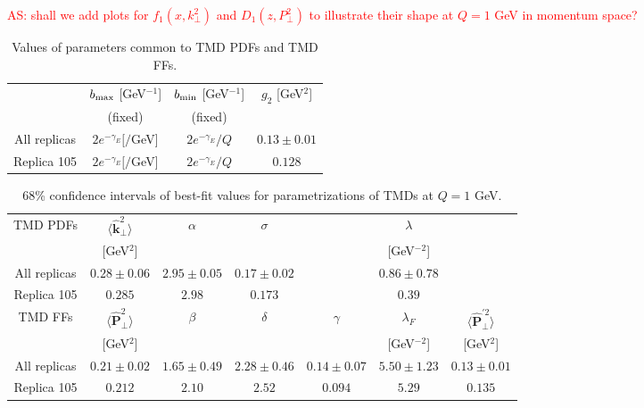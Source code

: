 \documentclass[aps,preprintnumbers,showpacs,nofootinbib,superscriptaddress,floatfix]{revtex4}
\newcommand{\T}{\perp}
\begin{document}
\textcolor{red}{AS: shall we add plots for $f_1(x,k_\perp^2)$ and $D_1(z,P_\perp^2)$ to illustrate their shape at $Q=1$ GeV in momentum space?}
\begin{table}[h!]
\small
  \centering
  \begin{tabular}{|c|c|c|c|}
\hline
\hline
&$b_{\rm max}$ [GeV$^{-1}$] & $b_{\rm min}$ [GeV$^{-1}$] &  $g_2$ {[GeV$^2$]} 
 \\ 
& (fixed)     & (fixed)   &                            \\
\hline
All replicas & $2 e^{-\gamma_E}[/$GeV]& $2 e^{-\gamma_E}/Q$  & $0.13 \pm 0.01$  \\
\hline
Replica 105 &  $2 e^{-\gamma_E}[/$GeV]& $2 e^{-\gamma_E}/Q$  & $0.128$  \\
\hline
\hline
\end{tabular}
\caption{Values of parameters common to TMD PDFs and TMD FFs.}
\label{t:fl_ind_parcommon}
\end{table}
\begin{table}[h!]
\small
  \centering
  \begin{tabular}{|c||c|c|c|c|c|c|}
\hline
\hline
TMD PDFs&  $\big \langle \hat{\bm{k}}_{\T}^2 \big \rangle$ 
& $\alpha$ & $\sigma$ & & $\lambda$ &  
 \\ 
        & {[GeV$^2$]}                               &
       &      &  &{[GeV$^{-2}$]} & \\
\hline
All replicas &  $0.28\pm 0.06$ & $2.95\pm 0.05$ & $0.17\pm 0.02$ & 
                & $0.86\pm 0.78$ & 
\\
\hline
Replica 105  &  $0.285$ & $2.98$ & $0.173$ & & $0.39$ & \\
\hline
\hline
TMD FFs&  $\big \langle \hat{\bm{P}}_{\perp}^2 \big \rangle$ &
$\beta$ & $\delta$ & $\gamma$ & $\lambda_F$ & $\big \langle
\hat{\bm{P}}_{\perp}^{\prime 2} \big \rangle$
 \\ 
        & {[GeV$^2$]} &            &        & &{[GeV$^{-2}$]} &{[GeV$^2$]}    \\
\hline
All replicas & $0.21\pm 0.02$ & $1.65\pm 0.49$ & $2.28\pm 0.46$ & $0.14\pm 0.07$ &
$5.50\pm 1.23$ & $0.13\pm 0.01$ \\
\hline
Replica 105   &  
 $0.212$ & $2.10$ & $2.52$ & $0.094$ & $5.29$ & $0.135$ \\
\hline
\hline
\end{tabular}
\caption{68\% confidence intervals of best-fit values for parametrizations of TMDs at $Q=1$ GeV.}
\label{t:fl_ind_par_TMD}
\end{table}
\end{document}
